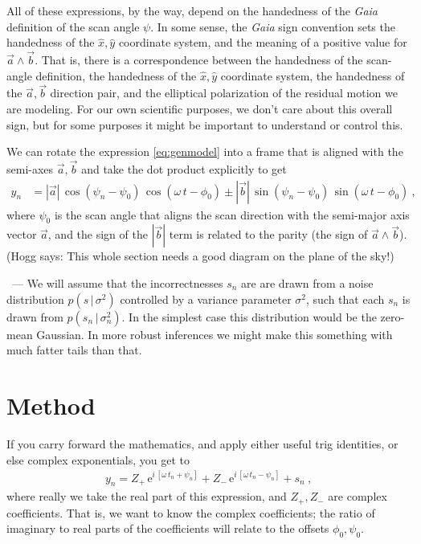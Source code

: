 \documentclass{article}
\renewcommand{\paragraph}[1]{\medskip\par\noindent{\textbf{#1}}~---}
\newcommand{\e}{\mathrm{e}}
\newcommand{\given}{\,|\,}
\newcommand{\hoggsay}[1]{{\color{blue} (Hogg says: #1)}}
\begin{document}
All of these expressions, by the way, depend on the handedness of the \textsl{Gaia} definition of the scan angle $\psi$.
In some sense, the \textsl{Gaia} sign convention sets the handedness of the $\hat{x},\hat{y}$ coordinate system,
and the meaning of a positive value for $\vec{a}\wedge\vec{b}$.
That is, there is a correspondence between the handedness of the scan-angle definition, the handedness of the $\hat{x},\hat{y}$ coordinate system,
the handedness of the $\vec{a},\vec{b}$ direction pair, and the elliptical polarization of the residual motion we are modeling.
For our own scientific purposes, we don't care about this overall sign, but for some purposes it might be important to understand or control this.

We can rotate the expression \eqref{eq:genmodel} into a frame that is aligned with the semi-axes $\vec{a},\vec{b}$ and take the dot product explicitly to get
\begin{align}
    y_n &= |\vec{a}|\,\cos(\psi_n-\psi_0)\,\cos(\omega\,t-\phi_0) \pm |\vec{b}|\,\sin(\psi_n-\psi_0)\,\sin(\omega\,t-\phi_0) ~,
\end{align}
where $\psi_0$ is the scan angle that aligns the scan direction with the semi-major axis vector $\vec{a}$,
and the sign of the $|\vec{b}|$ term is related to the parity (the sign of $\vec{a}\wedge\vec{b}$). \hoggsay{This whole section needs a good diagram on the plane of the sky!}

\paragraph{Noise and robustness}
We will assume that the incorrectnesses $s_n$ are are drawn from a noise distribution $p(s\given\sigma^2)$ controlled by a variance parameter $\sigma^2$, such that each $s_n$ is drawn from $p(s_n\given\sigma^2_n)$.
In the simplest case this distribution would be the zero-mean Gaussian.
In more robust inferences we might make this something with much fatter tails than that.

\section{Method}\label{sec:method}
If you carry forward the mathematics, and apply either useful trig identities, or else complex exponentials, you get to
\begin{align}
    y_n = Z_+\,\e^{i\,[\omega\,t_n + \psi_n]} + Z_-\,\e^{i\,[\omega\,t_n - \psi_n]} + s_n ~, \label{eq:zs}
\end{align}
where really we take the real part of this expression,
and $Z_+, Z_-$ are complex coefficients.
That is, we want to know the complex coefficients; the ratio of imaginary to real parts of the coefficients will relate
to the offsets $\phi_0,\psi_0$.
\end{document}

